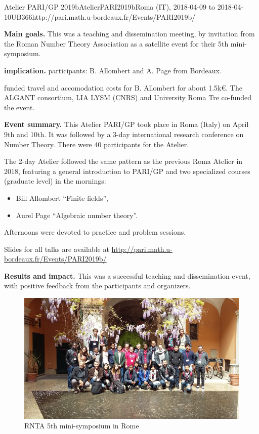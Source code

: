 \begin{event}{Atelier PARI/GP 2019b}{AtelierPARI2019b}{Roma (IT),
2018-04-09 to 2018-04-10}{UB}{36}{6}{http://pari.math.u-bordeaux.fr/Events/PARI2019b/}

\textbf{Main goals.} This was a teaching and dissemination meeting, by
invitation from the Roman Number Theory Association as a satellite
event for their 5th mini-symposium.

\textbf{\ODK implication.} \ODK participants: B. Allombert and A. Page from
Bordeaux.

\ODK funded travel and accomodation costs for B. Allombert for about
  1.5k\euro. The ALGANT consortium, LIA LYSM (CNRS) and University Roma Tre
  co-funded the event.

\textbf{Event summary.} This Atelier PARI/GP took place in Roma (Italy) on
April 9th and 10th.  It was followed by a 3-day international research
conference on Number Theory. There were 40 participants for the
Atelier.

The 2-day Atelier followed the same pattern as the previous Roma Atelier
in 2018,
featuring a general introduction to PARI/GP and two
  specialized courses (graduate level) in the mornings:
\begin{itemize}
\item Bill Allombert ``Finite fields'',
\item Aurel Page ``Algebraic number theory''.
\end{itemize}
Afternoons were devoted to practice and problem sessions.

Slides for all talks are available at
\url{http://pari.math.u-bordeaux.fr/Events/PARI2019b/}

\textbf{Results and impact.} This was a successful teaching and dissemination
event, with positive feedback from the participants and organizers.

\begin{figure}[ht]
  \includegraphics[scale=0.5]{pari2019b.jpg}
\caption*{RNTA 5th mini-symposium in Rome}
\end{figure}
\end{event}
